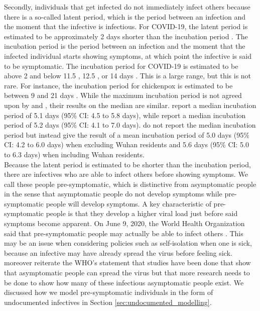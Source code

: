 \documentclass[12pt]{article}
\begin{document}
	Secondly, individuals that get infected do not immediately infect others because there is a so-called latent period, which is the period between an infection and the moment that the infective is infectious. For COVID-19, the latent period is estimated to be approximately 2 days shorter than the incubation period \parencite{he2020temporal}. The incubation period is the period between an infection and the moment that the infected individual starts showing symptoms, at which point the infective is said to be symptomatic. The incubation period for COVID-19 is estimated to be above 2 and below 11.5 \parencite{lauer2020incubation}, 12.5 \parencite{li2020incubation}, or 14 days \parencite{linton2020incubation}. This is a large range, but this is not rare. For instance, the incubation period for chickenpox is estimated to be between 9 and 21 days \parencite{papadopoulos2018chickenpox}. While the maximum incubation period is not agreed upon by \textcite{lauer2020incubation} and \textcite{li2020incubation}, their results on the median are similar. \textcite{lauer2020incubation} report a median incubation period of 5.1 days (95\% CI: 4.5 to 5.8 days), while \textcite{li2020incubation} report a median incubation period of 5.2 days (95\% CI: 4.1 to 7.0 days). \textcite{linton2020incubation} do not report the median incubation period but instead give the result of a mean incubation period of 5.0 days (95\% CI: 4.2 to 6.0 days) when excluding Wuhan residents and 5.6 days (95\% CI: 5.0 to 6.3 days) when including Wuhan residents. \\
	
	Because the latent period is estimated to be shorter than the incubation period, there are infectives who are able to infect others before showing symptoms. We call these people pre-symptomatic, which is distinctive from asymptomatic people in the sense that asymptomatic people do not develop symptoms while pre-symptomatic people will develop symptoms. A key characteristic of pre-symptomatic people is that they develop a higher viral load just before said symptoms become apparent. On June 9, 2020, the World Health Organization said that pre-symptomatic people may actually be able to infect others \parencite{bloomberg2020AsymptomaticSpread}. This may be an issue when considering policies such as self-isolation when one is sick, because an infective may have already spread the virus before feeling sick. \textcite{bloomberg2020AsymptomaticSpread} moreover reiterate the WHO's statement that studies have been done that show that asymptomatic people can spread the virus but that more research needs to be done to show how many of these infectious asymptomatic people exist. We discussed how we model pre-symptomatic individuals in the form of undocumented infectives in Section \ref{sec:undocumented_modelling}. \\
	
\end{document}
